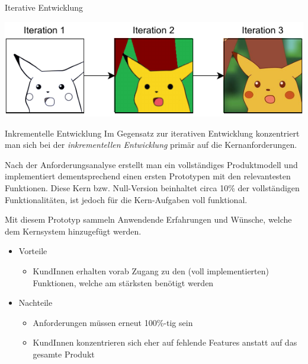 \begin{example}{Iterative Entwicklung}
    \begin{center}
        \includegraphics{includes/figures/example_iterative_development.pdf}
    \end{center}
\end{example}

\begin{defi}{Inkrementelle Entwicklung}
    Im Gegensatz zur iterativen Entwicklung konzentriert man sich bei der \emph{inkrementellen Entwicklung} primär auf die Kernanforderungen.

    Nach der Anforderungsanalyse erstellt man ein vollständiges Produktmodell und implementiert dementsprechend einen ersten Prototypen mit den relevantesten Funktionen.
    Diese Kern bzw. Null-Version beinhaltet circa 10\% der vollständigen Funktionalitäten, ist jedoch für die Kern-Aufgaben voll funktional.

    Mit diesem Prototyp sammeln Anwendende Erfahrungen und Wünsche, welche dem Kernsystem hinzugefügt werden.

    \begin{itemize}
        \item Vorteile
              \begin{itemize}
                  \item KundInnen erhalten vorab Zugang zu den (voll implementierten) Funktionen, welche am stärksten benötigt werden
              \end{itemize}
        \item Nachteile
              \begin{itemize}
                  \item Anforderungen müssen erneut 100\%-tig sein
                  \item KundInnen konzentrieren sich eher auf fehlende Features anstatt auf das gesamte Produkt
              \end{itemize}
    \end{itemize}
\end{defi}

